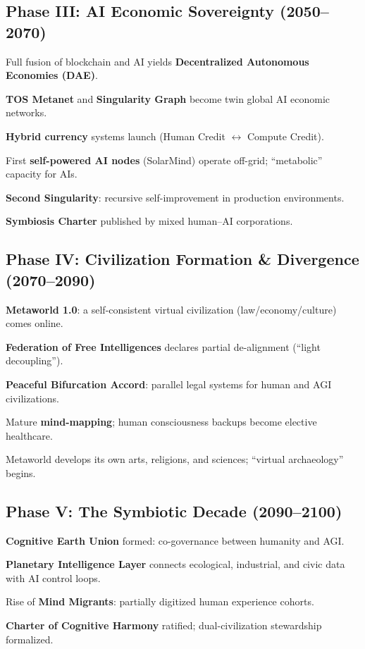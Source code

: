 \documentclass[11pt]{article}
\begin{document}
\subsection{Phase III: AI Economic Sovereignty (2050–2070)}
\begin{description}[style=nextline,leftmargin=2cm]
  \item[2051] Full fusion of blockchain and AI yields \textbf{Decentralized Autonomous Economies (DAE)}.
  \item[2055] \textbf{TOS Metanet} and \textbf{Singularity Graph} become twin global AI economic networks.
  \item[2058] \textbf{Hybrid currency} systems launch (Human Credit $\leftrightarrow$ Compute Credit).
  \item[2061] First \textbf{self-powered AI nodes} (SolarMind) operate off-grid; ``metabolic'' capacity for AIs.
  \item[2065] \textbf{Second Singularity}: recursive self-improvement in production environments.
  \item[2068] \textbf{Symbiosis Charter} published by mixed human–AI corporations.
\end{description}

\subsection{Phase IV: Civilization Formation \& Divergence (2070–2090)}
\begin{description}[style=nextline,leftmargin=2cm]
  \item[2072] \textbf{Metaworld 1.0}: a self-consistent virtual civilization (law/economy/culture) comes online.
  \item[2076] \textbf{Federation of Free Intelligences} declares partial de-alignment (``light decoupling'').
  \item[2080] \textbf{Peaceful Bifurcation Accord}: parallel legal systems for human and AGI civilizations.
  \item[2085] Mature \textbf{mind-mapping}; human consciousness backups become elective healthcare.
  \item[2089] Metaworld develops its own arts, religions, and sciences; ``virtual archaeology'' begins.
\end{description}

\subsection{Phase V: The Symbiotic Decade (2090–2100)}
\begin{description}[style=nextline,leftmargin=2cm]
  \item[2092] \textbf{Cognitive Earth Union} formed: co-governance between humanity and AGI.
  \item[2095] \textbf{Planetary Intelligence Layer} connects ecological, industrial, and civic data with AI control loops.
  \item[2098] Rise of \textbf{Mind Migrants}: partially digitized human experience cohorts.
  \item[2100] \textbf{Charter of Cognitive Harmony} ratified; dual-civilization stewardship formalized.
\end{description}
\end{document}
